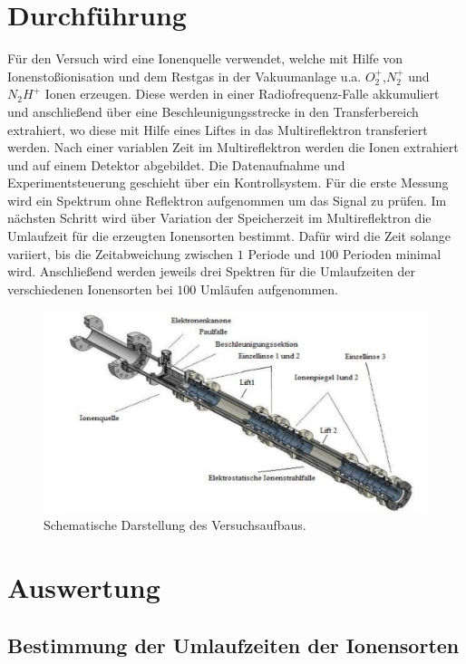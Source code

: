 \documentclass[numbers=noenddot,a4paper,notitlepage,twoside,BCOR15mm]{scrartcl}
\begin{document}
		
	\newpage
	\section{Durchführung}
		
		Für den Versuch wird eine Ionenquelle verwendet, welche mit Hilfe von Ionenstoßionisation und dem Restgas in der Vakuumanlage u.a. $O_2^+$,$N_2^+$ und $N_2H^+$ Ionen erzeugen. Diese werden in einer Radiofrequenz-Falle akkumuliert und anschließend über eine Beschleunigungsstrecke in den Transferbereich extrahiert, wo diese mit Hilfe eines Liftes in das Multireflektron transferiert werden. Nach einer variablen Zeit im Multireflektron werden die Ionen extrahiert und auf einem Detektor abgebildet.
		Die Datenaufnahme und Experimentsteuerung geschieht über ein Kontrollsystem. Für die erste Messung wird ein Spektrum ohne Reflektron aufgenommen um das Signal zu prüfen. Im nächsten Schritt wird über Variation der Speicherzeit im Multireflektron die Umlaufzeit für die erzeugten Ionensorten bestimmt. Dafür wird die Zeit solange variiert, bis die Zeitabweichung zwischen $1$ Periode und $100$ Perioden minimal wird.
		Anschließend werden jeweils drei Spektren für die Umlaufzeiten der verschiedenen Ionensorten bei $100$ Umläufen aufgenommen. 
		
				\begin{figure}[h]
					\centering
					\includegraphics[width=1\columnwidth]{pics/Aufbau}
					\caption{Schematische Darstellung des Versuchsaufbaus.}
					\label{abb:aufbau}
				\end{figure}
				
		
	\newpage
	\section{Auswertung}
	
	\subsection{Bestimmung der Umlaufzeiten der Ionensorten}
	
\end{document}
